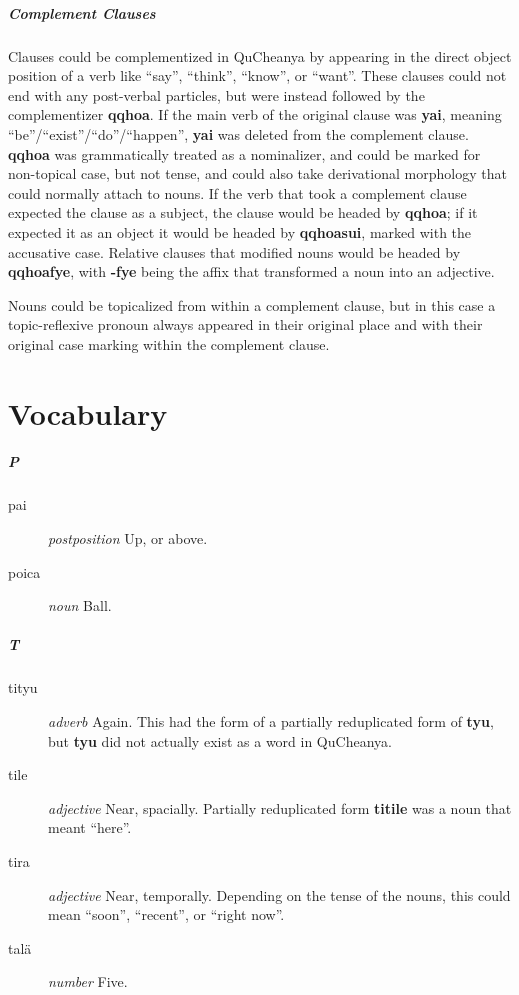 \documentclass{article}
\begin{document}
\subsubsection{Complement Clauses}

Clauses could be complementized in QuCheanya by appearing in the direct object position of a verb like ``say'', ``think'', ``know'', or ``want''.  These clauses could not end with any post-verbal particles, but were instead followed by the complementizer \textbf{qqhoa}.  If the main verb of the original clause was \textbf{yai}, meaning ``be''/``exist''/``do''/``happen'', \textbf{yai} was deleted from the complement clause. \textbf{qqhoa} was grammatically treated as a nominalizer, and could be marked for non-topical case, but not tense, and could also take derivational morphology that could normally attach to nouns.  If the verb that took a complement clause expected the clause as a subject, the clause would be headed by \textbf{qqhoa}; if it expected it as an object it would be headed by \textbf{qqhoasui}, marked with the accusative case.  Relative clauses that modified nouns would be headed by \textbf{qqhoafye}, with \textbf{-fye} being the affix that transformed a noun into an adjective.

Nouns could be topicalized from within a complement clause, but in this case a topic-reflexive pronoun always appeared in their original place and with their original case marking within the complement clause.

\part{Vocabulary}

\subsubsection{P}

\begin{description}
\item [pai] \emph{postposition} Up, or above.
\item [poica] \emph{noun} Ball.
\end{description}

\subsubsection{T}

\begin{description}
\item [tityu] \emph{adverb} Again.  This had the form of a partially reduplicated form of \textbf{tyu}, but \textbf{tyu} did not actually exist as a word in QuCheanya.
\item [tile] \emph{adjective} Near, spacially.  Partially reduplicated form \textbf{titile} was a noun that meant ``here''.
\item [tira] \emph{adjective} Near, temporally.  Depending on the tense of the nouns, this could mean ``soon'', ``recent'', or ``right now''.
\item [tal\"a] \emph{number} Five.
\end{description}
\end{document}
